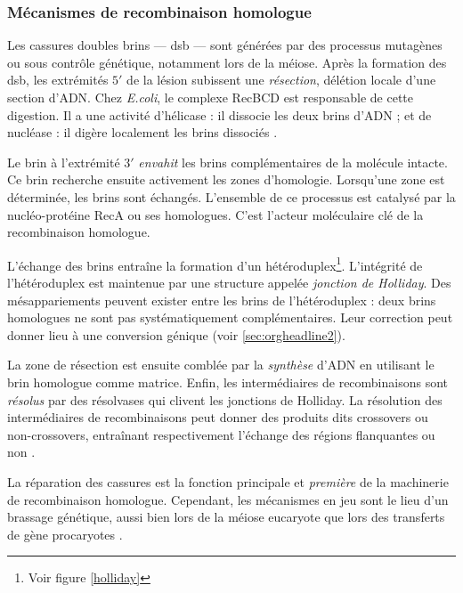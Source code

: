 \documentclass[11pt, oneside]{scrartcl}
\begin{document}
\subsubsection{Mécanismes de recombinaison homologue}
\label{sec:orgheadline3}

Les cassures doubles brins --- \ac{dsb} --- sont générées par des processus
mutagènes ou sous contrôle génétique, notamment lors de la méiose. Après la
formation des \ac{dsb}, les extrémités \(5'\) de la lésion subissent une
\emph{résection}, délétion locale d'une section d'ADN. Chez \emph{E.coli}, le complexe
RecBCD est responsable de cette digestion. Il a une activité d'hélicase : il
dissocie les deux brins d'ADN ; et de nucléase : il digère localement les brins
dissociés \cite{dillingham_recbcd_2008}.

Le brin à l'extrémité \(3'\) \emph{envahit} les brins complémentaires de la molécule
intacte. Ce brin recherche ensuite activement les zones d'homologie. Lorsqu'une
zone est déterminée, les brins sont échangés. L'ensemble de ce processus est
catalysé par la nucléo-protéine RecA \cite{chen_mechanism_2008} ou ses
homologues. C'est l'acteur moléculaire clé de la recombinaison homologue.

L'échange des brins entraîne la formation d'un hétéroduplex\footnote{Voir figure
\ref{holliday}}. L'intégrité de l'hétéroduplex est maintenue par une structure
appelée \emph{jonction de Holliday}. Des mésappariements peuvent exister entre les
brins de l'hétéroduplex : deux brins homologues ne sont pas systématiquement
complémentaires. Leur correction peut donner lieu à une conversion génique (voir
\ref{sec:orgheadline2}).

La zone de résection est ensuite comblée par la \emph{synthèse} d'ADN en utilisant le
brin homologue comme matrice. Enfin, les intermédiaires de recombinaisons sont
\emph{résolus} par des résolvases qui clivent les jonctions de Holliday. La résolution
des intermédiaires de recombinaisons peut donner des produits dits crossovers ou
non-crossovers, entraînant respectivement l'échange des régions flanquantes ou
non \cite{mancera_high-resolution_2008}.

\begin{transition}
La réparation des cassures est la fonction principale et \emph{première} de la
machinerie de recombinaison homologue. Cependant, les mécanismes en jeu sont le
lieu d'un brassage génétique, aussi bien lors de la méiose eucaryote que lors
des transferts de gène procaryotes \cite{redfield_bacteria_2001}.
\end{transition}
\end{document}
